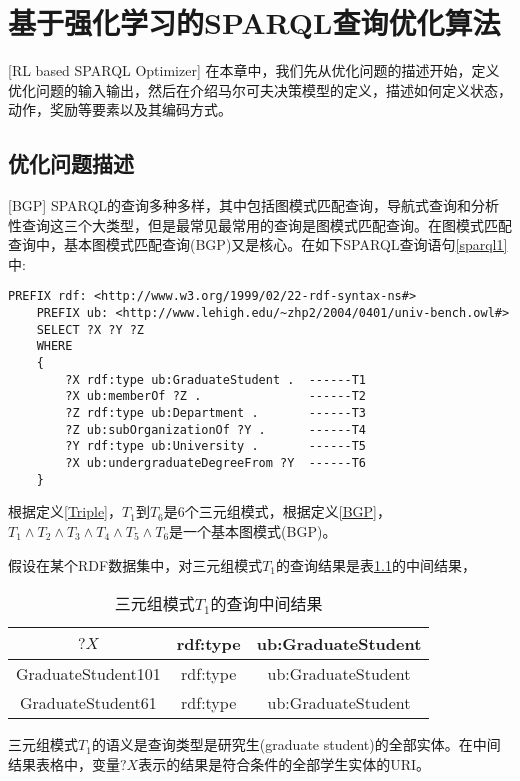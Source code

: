 \chapter{基于强化学习的SPARQL查询优化算法}[RL based SPARQL Optimizer]
在本章中，我们先从优化问题的描述开始，定义优化问题的输入输出，然后在介绍马尔可夫决策模型的定义，描述如何定义状态，动作，奖励等要素以及其编码方式。

\section{优化问题描述}[BGP]
SPARQL的查询多种多样，其中包括图模式匹配查询，导航式查询和分析性查询这三个大类型，但是最常见最常用的查询是图模式匹配查询。在图模式匹配查询中，基本图模式匹配查询(BGP)又是核心。在如下SPARQL查询语句\ref{sparql1}中:
\begin{lstlisting}[caption={SPARQL查询语句},label={sparql1}]
    PREFIX rdf: <http://www.w3.org/1999/02/22-rdf-syntax-ns#>
    PREFIX ub: <http://www.lehigh.edu/~zhp2/2004/0401/univ-bench.owl#>
    SELECT ?X ?Y ?Z
    WHERE
    {
        ?X rdf:type ub:GraduateStudent .  ------T1
        ?X ub:memberOf ?Z .               ------T2
        ?Z rdf:type ub:Department .       ------T3
        ?Z ub:subOrganizationOf ?Y .      ------T4
        ?Y rdf:type ub:University .       ------T5        
        ?X ub:undergraduateDegreeFrom ?Y  ------T6
    }
\end{lstlisting}
根据定义\ref{Triple}，$T_1$到$T_6$是6个三元组模式，根据定义\ref{BGP}，$T_1\wedge T_2\wedge T_3\wedge T_4\wedge T_5\wedge T_6$是一个基本图模式(BGP)。

假设在某个RDF数据集中，对三元组模式$T_1$的查询结果是表\ref{T1}的中间结果，
\begin{table}[htbp]
    \caption[table1]{三元组模式$T_1$的查询中间结果}
    \label{T1}
    \vspace{0.5em}\centering\wuhao
    \begin{tabular}{|c|c|c|}
    \toprule[1.5pt]
    $?X$ & rdf:type & ub:GraduateStudent\\
    \midrule[1pt]
    GraduateStudent101 & rdf:type & ub:GraduateStudent\\
    GraduateStudent61 & rdf:type &ub:GraduateStudent\\
    \bottomrule[1.5pt]
    \end{tabular}
\end{table}
三元组模式$T_1$的语义是查询类型是研究生(graduate student)的全部实体。在中间结果表格中，变量$?X$表示的结果是符合条件的全部学生实体的URI。

